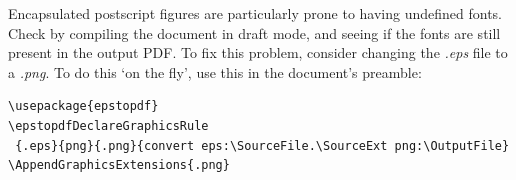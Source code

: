 \documentclass[12pt,letterpaper]{report}
\begin{document}
Encapsulated postscript figures are particularly prone to having undefined fonts. Check by compiling the document in draft mode, and seeing if the fonts are still present in the output PDF. To fix this problem, consider changing the \emph{.eps} file to a \emph{.png}. To do this `on the fly', use this in the document's preamble:

\begin{verbatim}
\usepackage{epstopdf}
\epstopdfDeclareGraphicsRule
 {.eps}{png}{.png}{convert eps:\SourceFile.\SourceExt png:\OutputFile}
\AppendGraphicsExtensions{.png}
\end{verbatim}


\cleardoublepage

\label{sec:Bib}

\end{document}
